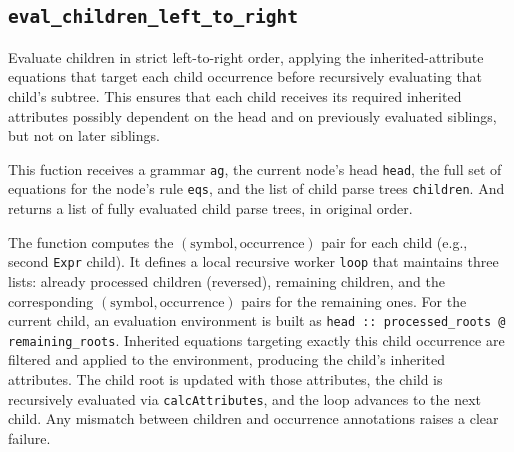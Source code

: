\subsection{\texttt{eval\_children\_left\_to\_right}}

Evaluate children in strict left-to-right order, applying the inherited-attribute equations that target each child occurrence before recursively evaluating that 
child's subtree. This ensures that each child receives its required inherited attributes possibly dependent on the head and on previously evaluated siblings, 
but not on later siblings.

This fuction receives a grammar \texttt{ag}, the current node's head \texttt{head}, the full set of equations for the node's rule \texttt{eqs}, and the list 
of child parse trees \texttt{children}. And returns a list of fully evaluated child parse trees, in original order. 

The function computes the $(\text{symbol}, \text{occurrence})$ pair for each child (e.g., second \texttt{Expr} child). It defines a 
local recursive worker \texttt{loop} that maintains three lists: already processed children (reversed), 
remaining children, and the corresponding $(\text{symbol}, \text{occurrence})$ pairs for the remaining ones. For the current child, an evaluation 
environment is built as \texttt{head :: processed\_roots @ remaining\_roots}. Inherited equations targeting exactly this child occurrence are filtered and 
applied to the environment, producing the child's inherited attributes. The child root is updated with those attributes, the child is recursively evaluated 
via \texttt{calcAttributes}, and the loop advances to the next child. Any mismatch between children and occurrence annotations raises a clear failure.


